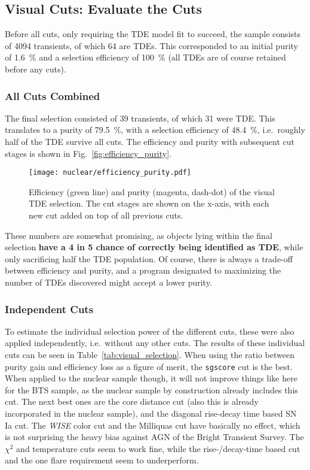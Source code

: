 \subsection{Visual Cuts: Evaluate the Cuts}
Before all cuts, only requiring the TDE model fit to succeed, the sample consists of 4094 transients, of which 64 are TDEs. This corresponded to an initial purity of \SI{1.6}{\percent} and a selection efficiency of \SI{100}{\percent} (all TDEs are of course retained before any cuts).

\subsubsection{All Cuts Combined}
The final selection consisted of 39 transients, of which 31 were TDE. This translates to a purity of \SI{79.5}{\percent}, with a selection efficiency of \SI{48.4}{\percent}, i.e.~roughly half of the TDE survive all cuts.
The efficiency and purity with subsequent cut stages is shown in Fig.~\ref{fig:efficiency_purity}.

\begin{figure}[htpb]
  \texttt{[image: nuclear/efficiency\_purity.pdf]}
  \caption[Visual TDE selection]{Efficiency (green line) and purity (magenta, dash-dot) of the visual TDE selection. The cut stages are shown on the x-axis, with each new cut added on top of all previous cuts.}
\end{figure}

These numbers are somewhat promising, as objects lying within the final selection \textbf{have a 4 in 5 chance of correctly being identified as TDE}, while only sacrificing half the TDE population. Of course, there is always a trade-off between efficiency and purity, and a program designated to maximizing the number of TDEs discovered might accept a lower purity.

\subsubsection{Independent Cuts}
To estimate the individual selection power of the different cuts, these were also applied independently, i.e.~without any other cuts. The results of these individual cuts can be seen in Table~\ref{tab:visual_selection}. When using the ratio between purity gain and efficiency loss as a figure of merit, the \texttt{sgscore} cut is the best. When applied to the nuclear sample though, it will not improve things like here for the BTS sample, as the nuclear sample by construction already includes this cut. The next best ones are the core distance cut (also this is already incorporated in the nuclear sample), and the diagonal rise-decay time based SN Ia cut.  The \textit{WISE} color cut and the Milliquas cut have basically no effect, which is not surprising the heavy bias against AGN of the Bright Transient Survey. The $\chi^2$ and temperature cuts seem to work fine, while the rise-/decay-time based cut and the one flare requirement seem to underperform.

